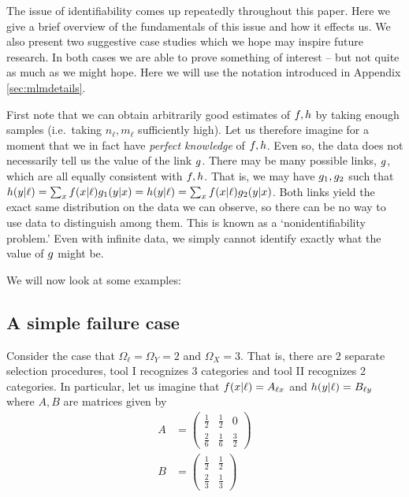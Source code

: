\label{sec:casestudies}

The issue of identifiability comes up repeatedly throughout this paper.  Here we give a brief overview of the fundamentals of this issue and how it effects us.  We also present two suggestive case studies which we hope may inspire future research.  In both cases we are able to prove something of interest -- but not quite as much as we might hope.  Here we will use the notation introduced in Appendix \ref{sec:mlmdetails}.

First note that we can obtain arbitrarily good estimates of $f,h$ by taking enough samples (i.e.\ taking $n_\ell,m_\ell$ sufficiently high).  Let us therefore imagine for a moment that we in fact have \emph{perfect knowledge} of $f,h$.  Even so, the data does not necessarily tell us the value of the link $g$.  There may be many possible links, $g$, which are all equally consistent with $f,h$.  That is, we may have $g_1,g_2$ such that $h(y|\ell)=\sum_x f(x|\ell)g_1(y|x)=h(y|\ell)=\sum_x f(x|\ell)g_2(y|x)$.  Both links yield the exact same distribution on the data we can observe, so there can be no way to use data to distinguish among them.  This is known as a `nonidentifiability problem.'  Even with infinite data, we simply cannot identify exactly what the value of $g$ might be.

We will now look at some examples:

\subsection{A simple failure case}

Consider the case that $\Omega_\ell = \Omega_Y = 2$ and $\Omega_X=3$.  That is, there are $2$ separate selection procedures, tool I recognizes 3 categories and tool II recognizes 2 categories.  In particular, let us imagine that $f(x|\ell)=A_{\ell x}$ and $h(y|\ell)=B_{\ell y}$ where $A,B$ are matrices given by 
%
\begin{align*}
A&=\left(\begin{array}{ccc}
\frac{1}{2} & \frac{1}{2} & 0\\
\frac{2}{6} & \frac{1}{6} & \frac{3}{2}
\end{array}\right) \\
B&=\left(\begin{array}{cc}
\frac{1}{2} & \frac{1}{2}\\
\frac{2}{3} & \frac{1}{3}
\end{array}\right)
\end{align*}

